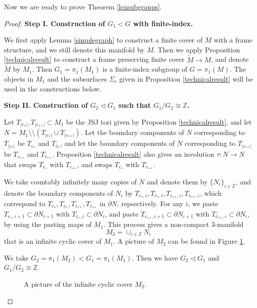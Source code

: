 \documentclass{amsart}
\numberwithin{equation}{section}
\theoremstyle{definition}
\begin{document}
Now we are ready to prove Theorem \ref{lexsubgroups}.

\begin{proof}
{\bf Step I. Construction of $G_1<G$ with finite-index.} 

We first apply Lemma \ref{simplegraph} to construct a finite cover of $M$ with a frame structure, and we still denote this manifold by $M$.
Then we apply Proposition \ref{technicalresult} to construct a frame preserving finite cover $\tilde{M}\to M$, and denote $\tilde{M}$ by $M_1$. Then $G_1=\pi_1(M_1)$ is a finite-index subgroup of $G=\pi_1(M)$. The objects in $M_1$ and the subsurfaces $\Sigma_c$ given in Proposition \ref{technicalresult} will be used in the constructions below.
\bigskip

{\bf Step II. Construction of $G_2\vartriangleleft G_1$ such that $G_1/G_2\cong \mathbb{Z}$.} 

Let $T_{|e_*|},T_{|e_{**}|}\subset M_1$ be the JSJ tori given by Proposition \ref{technicalresult}, and let $N=M_1\setminus\setminus (T_{|e_*|}\cup T_{|e_{**}|})$. Let the boundary components of $N$ corresponding to $T_{|e_*|}$ be $T_{e_*}$ and $T_{\bar{e}_*}$, and let the boundary components of $N$ corresponding to $T_{|e_{**}|}$ be $T_{e_{**}}$ and $T_{\bar{e}_{**}}$. Proposition \ref{technicalresult} also gives an involution $\tau:N\to N$ that swaps $T_{e_*}$ with $T_{e_{**}}$, and swaps $T_{\bar{e}_*}$ with $T_{\bar{e}_{**}}$.

We take countably infinitely many copies of $N$ and denote them by $\{N_i\}_{i\in \mathbb{Z}}$, and denote the boundary components of $N_i$ by $T_{e_*,i}, T_{\bar{e}_*,i},T_{e_{**},i},T_{\bar{e}_{**},i}$, which correspond to $T_{e_*}, T_{\bar{e}_*},T_{e_{**}},T_{\bar{e}_{**}}$ in $\partial N$, repsectively. For any $i$, we paste $T_{e_*,i+1}\subset \partial N_{i+1}$ with $T_{\bar{e}_*,i}\subset \partial N_{i}$, and paste $T_{e_{**},i+1}\subset \partial N_{i+1}$ with $T_{\bar{e}_{**},i}\subset \partial N_{i}$, by using the pasting maps of $M_1$. This process gives a non-compact $3$-manifold $$M_2=\cup_{i\in \mathbb{Z}}N_i$$ that is an infinite cyclic cover of $M_1$. A picture of $M_2$ can be found in Figure \ref{Figure3}.

We take $G_2=\pi_1(M_2)<G_1=\pi_1(M_1)$. Then we have $G_2\vartriangleleft G_1$ and $G_1/G_2\cong \mathbb{Z}$.

\begin{figure}[htbp]
    \centering
    \def\svgwidth{5in} %
   
    \caption{A picture of the infinite cyclic cover $M_2$.}
     \label{Figure3}
\end{figure}


\end{proof}
\end{document}
